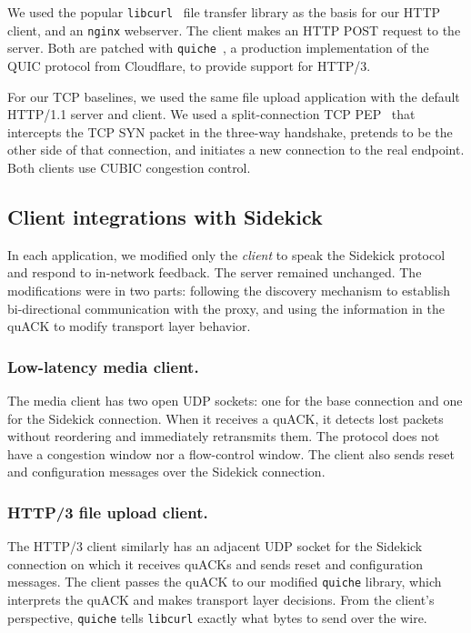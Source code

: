 We used the popular \texttt{libcurl}~\cite{libcurl} file transfer library as the
basis for our HTTP client, and an \texttt{nginx} webserver. The client makes an
HTTP POST request to the server. Both are patched with \texttt{quiche}~\cite
{quiche}, a production implementation of the QUIC protocol from Cloudflare, to
provide support for HTTP/3.

For our TCP baselines, we used the same file upload application with the
default HTTP/1.1 server and client. We used a split-connection
TCP PEP~\cite{caini2006pepsal} that intercepts the TCP
SYN packet in the three-way handshake, pretends to be the other side of that
connection, and initiates a new connection to the real endpoint.
Both clients use CUBIC congestion control.

\subsection{Client integrations with Sidekick}
\label{sec:sidekick:implementation:client-integrations}

In each application, we modified only the \emph{client} to speak the Sidekick
protocol and respond to in-network feedback. The server remained unchanged.
The modifications were in two parts: following the discovery mechanism to
establish bi-directional communication with the proxy, and using the information
in the quACK to modify transport layer behavior.



\subsubsection{Low-latency media client.}

The media client has two open UDP sockets: one for the base connection and one
for the Sidekick connection. When it receives a quACK, it detects lost packets
without reordering and immediately retransmits them. The protocol does not have
a congestion window nor a flow-control window. The client also sends reset and
configuration messages over the Sidekick connection.

\subsubsection{HTTP/3 file upload client.}

The HTTP/3 client similarly has an adjacent UDP socket for the Sidekick
connection on which it receives quACKs and sends reset and configuration
messages. The client passes the quACK to our modified \texttt{quiche} library,
which interprets the quACK and makes transport layer decisions. From the
client's perspective, \texttt{quiche} tells \texttt{libcurl} exactly what bytes
to send over the wire.

